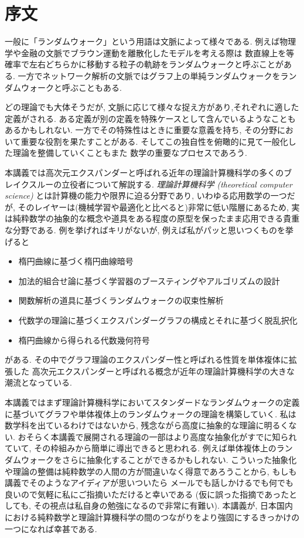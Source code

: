 \chapter*{序文}
一般に「ランダムウォーク」という用語は文脈によって様々である.
例えば物理学や金融の文脈でブラウン運動を離散化したモデルを考える際は
数直線上を等確率で左右どちらかに移動する粒子の軌跡をランダムウォークと呼ぶことがある.
一方でネットワーク解析の文脈ではグラフ上の単純ランダムウォークをランダムウォークと呼ぶこともある.

どの理論でも大体そうだが, 文脈に応じて様々な捉え方があり,それぞれに適した定義がされる.
ある定義が別の定義を特殊ケースとして含んでいるようなこともあるかもしれない.
一方でその特殊性はときに重要な意義を持ち, その分野において重要な役割を果たすことがある.
そしてこの独自性を俯瞰的に見て一般化した理論を整備していくこともまた
    数学の重要なプロセスであろう.

本講義では高次元エクスパンダーと呼ばれる近年の理論計算機科学の多くのブレイクスルーの立役者について解説する.
\emph{理論計算機科学 (theoretical computer science)} とは計算機の能力や限界に迫る分野であり, いわゆる応用数学の一つだが, そのレイヤーは(機械学習や最適化と比べると)非常に低い階層にあるため,
    実は純粋数学の抽象的な概念や道具をある程度の原型を保ったまま応用できる貴重な分野である.
例を挙げればキリがないが, 例えば私がパッと思いつくものを挙げると
\begin{itemize}
    \item 楕円曲線に基づく楕円曲線暗号
    \item 加法的組合せ論に基づく学習器のブースティングやアルゴリズムの設計
    \item 関数解析の道具に基づくランダムウォークの収束性解析
    \item 代数学の理論に基づくエクスパンダーグラフの構成とそれに基づく脱乱択化
    \item 楕円曲線から得られる代数幾何符号
\end{itemize}
がある.
その中でグラフ理論のエクスパンダー性と呼ばれる性質を単体複体に拡張した
    高次元エクスパンダーと呼ばれる概念が近年の理論計算機科学の大きな潮流となっている.

本講義ではまず理論計算機科学においてスタンダードなランダムウォークの定義に基づいてグラフや単体複体上のランダムウォークの理論を構築していく.
私は数学科を出ているわけではないから, 残念ながら高度に抽象的な理論に明るくない.
おそらく本講義で展開される理論の一部はより高度な抽象化がすでに知られていて, その枠組みから簡単に導出できると思われる.
例えば単体複体上のランダムウォークをさらに抽象化することができるかもしれない.
こういった抽象化や理論の整備は純粋数学の人間の方が間違いなく得意であろうことから,
もしも講義でそのようなアイディアが思いついたら
メールでも話しかけるでも何でも良いので気軽に私にご指摘いただけると幸いである
(仮に誤った指摘であったとしても, その視点は私自身の勉強になるので非常に有難い).
本講義が, 日本国内における純粋数学と理論計算機科学の間のつながりをより強固にするきっかけの一つになれば幸甚である.
